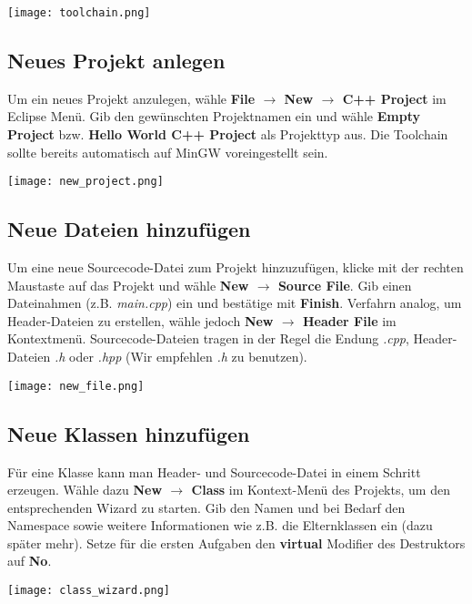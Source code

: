 \documentclass[
  accentcolor=tud1c,	%
  colorbacktitle,		%
  inverttitle,			%
  german,				%
  twoside
]{tudexercise}
\begin{document}
\texttt{[image: toolchain.png]}

\subsection{Neues Projekt anlegen}
Um ein neues Projekt anzulegen, wähle \textbf{File $\rightarrow$ New $\rightarrow$ C++ Project} im Eclipse Menü.
Gib den gewünschten Projektnamen ein und wähle \textbf{Empty Project} bzw. \textbf{Hello World C++ Project} als Projekttyp aus.
Die Toolchain sollte bereits automatisch auf MinGW voreingestellt sein.

\begin{center}
	\texttt{[image: new\_project.png]}
\end{center}

\subsection{Neue Dateien hinzufügen}

Um eine neue Sourcecode-Datei zum Projekt hinzuzufügen, klicke mit der rechten Maustaste auf das Projekt und wähle \textbf{New $\rightarrow$ Source File}.
Gib einen Dateinahmen (z.B. \emph{main.cpp}) ein und bestätige mit 
\textbf{Finish}. 
Verfahrn analog, um Header-Dateien zu erstellen, wähle jedoch \textbf{New $\rightarrow$ Header File} im Kontextmenü.
Sourcecode-Dateien tragen in der Regel die Endung \emph{.cpp}, Header-Dateien \emph{.h} oder \emph{.hpp} (Wir empfehlen \emph{.h} zu benutzen).

\begin{center}
	\texttt{[image: new\_file.png]}
\end{center}

\subsection{Neue Klassen hinzufügen}

Für eine Klasse kann man Header- und Sourcecode-Datei in einem Schritt erzeugen.
Wähle dazu \textbf{New $\rightarrow$ Class} im Kontext-Menü des Projekts, um den entsprechenden Wizard zu starten.
Gib den Namen und bei Bedarf den Namespace sowie weitere Informationen wie z.B. die Elternklassen ein (dazu später mehr).
Setze für die ersten Aufgaben den \textbf{virtual} Modifier des Destruktors auf \textbf{No}.

\begin{center}
	\texttt{[image: class\_wizard.png]}
\end{center}
\end{document}
